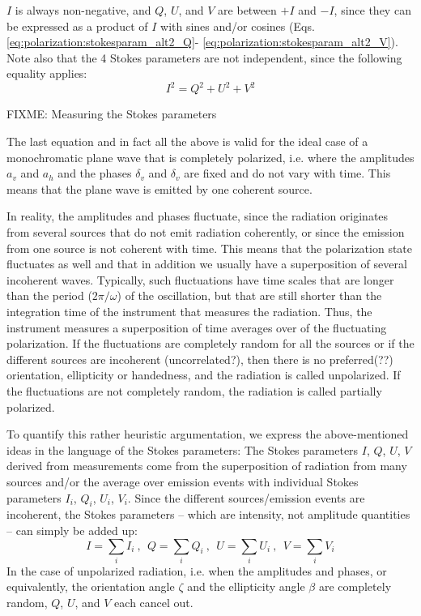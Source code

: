 $I$ is always non-negative, and $Q$, $U$, and $V$ are between $+I$ and $-I$,
since they can be expressed as a product of $I$ with sines and/or
cosines
(Eqs. \ref{eq:polarization:stokesparam_alt2_Q}-%
\ref{eq:polarization:stokesparam_alt2_V}). 
Note also that the 4 Stokes parameters are not independent, since the
following equality applies:
\begin{equation}
  \label{eq:polarization:Isquare}
  I^2 = Q^2 + U^2 + V^2
\end{equation}

\label{sec:polarization:measuring}
FIXME: Measuring the Stokes parameters


\label{sec:polarization:part_pol}
The last equation and in fact all the above is valid for the ideal case of a 
monochromatic plane wave that is completely polarized, i.e. where the
amplitudes $a_v$ and
$a_h$ and the phases $\delta_v$ and $\delta_v$ are fixed and do not
vary with time. This means that the plane wave is emitted by one
coherent source.

In reality, the amplitudes and phases fluctuate, since the radiation
originates from several sources that do not emit radiation coherently,
or since the emission from one source is not coherent with time. This
means that the polarization state fluctuates as well and that in
addition we usually have a superposition of several incoherent waves.
Typically, such fluctuations have time scales that are longer than the
period ($2\pi/\omega$) of the oscillation, but that are still shorter
than the integration time of the instrument that measures the
radiation. Thus, the instrument measures a superposition of time averages
over of the fluctuating polarization. If the fluctuations are
completely random for all the sources or if the different sources are
incoherent (uncorrelated?), then there is no preferred(??)
orientation, ellipticity or handedness, and the radiation is called
unpolarized. If the fluctuations are not completely random, the
radiation is called partially polarized.

To quantify this rather heuristic argumentation, we express the
above-mentioned ideas in the language of the Stokes parameters:
The Stokes parameters $I$, $Q$, $U$, $V$
derived from measurements come from the superposition of
radiation from many sources and/or the average over emission events with individual Stokes
parameters $I_i$, $Q_i$, $U_i$, $V_i$.  Since the different
sources/emission events are incoherent, the Stokes parameters -- which
are intensity, not amplitude quantities -- can
simply be added up:
\begin{equation}
  \label{eq:polarization:summed_stokes}
  I = \sum_i I_i \: \mbox{, }\; 
  Q = \sum_i Q_i \: \mbox{, }\; 
  U = \sum_i U_i \: \mbox{, }\; 
  V = \sum_i V_i
\end{equation}
In the case of unpolarized radiation, i.e. when the amplitudes and
phases, or equivalently, the orientation angle $\zeta$ and the
ellipticity angle $\beta$ are completely random, $Q$, $U$, and $V$
each cancel out.

